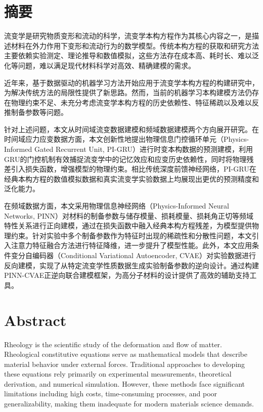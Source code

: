 \chapter{摘\texorpdfstring{\quad}{}要}
流变学是研究物质变形和流动的科学，流变学本构方程作为其核心内容之一，是描述材料在外力作用下变形和流动行为的数学模型。传统本构方程的获取和研究方法主要依赖实验测定、理论推导和数值模拟，这些方法存在成本高、耗时长、难以泛化等问题，难以满足现代材料科学对高效、精确建模的需求。

近年来，基于数据驱动的机器学习方法开始应用于流变学本构方程的构建研究中，为解决传统方法的局限性提供了新思路。然而，当前的机器学习本构建模方法仍存在物理约束不足、未充分考虑流变学本构方程的历史依赖性、特征稀疏以及难以反推制备参数等问题。

针对上述问题，本文从时间域流变数据建模和频域数据建模两个方向展开研究。在时间域应力应变数据方面，本文创新性地提出物理信息门控循环单元（Physics-Informed Gated Recurrent Unit, PI-GRU）进行时变本构数据的预测建模，利用GRU的门控机制有效捕捉流变学中的记忆效应和应变历史依赖性，同时将物理残差引入损失函数，增强模型的物理约束。相比传统深度前馈神经网络，PI-GRU在经典本构方程的数值模拟数据和真实流变学实验数据上均展现出更优的预测精度和泛化能力。

在频域数据方面，本文采用物理信息神经网络（Physics-Informed Neural Networks, PINN）对材料的制备参数与储存模量、损耗模量、损耗角正切等频域特性关系进行正向建模，通过在损失函数中融入经典本构方程残差，为模型提供物理约束。针对实验中多个制备参数作为特征时出现的稀疏性和分散性问题，本文引入注意力特征融合方法进行特征降维，进一步提升了模型性能。此外，本文应用条件变分自编码器（Conditional Variational Autoencoder, CVAE）对实验数据进行反向建模，实现了从特定流变学性质数据生成实验制备参数的逆向设计。通过构建PINN-CVAE正逆向联合建模框架，为高分子材料的设计提供了高效的辅助支持工具。

\chapter{Abstract}
Rheology is the scientific study of the deformation and flow of matter. Rheological constitutive equations serve as mathematical models that describe material behavior under external forces. Traditional approaches to developing these equations rely primarily on experimental measurements, theoretical derivation, and numerical simulation. However, these methods face significant limitations including high costs, time-consuming processes, and poor generalizability, making them inadequate for modern materials science demands.

